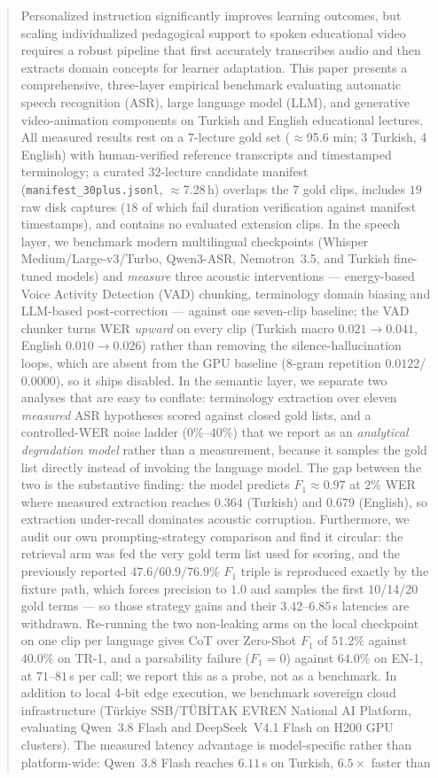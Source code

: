 \documentclass[conference]{IEEEtran}
\begin{document}
\begin{abstract}
Personalized instruction significantly improves learning outcomes, but scaling individualized pedagogical support to spoken educational video requires a robust pipeline that first accurately transcribes audio and then extracts domain concepts for learner adaptation. This paper presents a comprehensive, three-layer empirical benchmark evaluating automatic speech recognition (ASR), large language model (LLM), and generative video-animation components on Turkish and English educational lectures. All measured results rest on a $7$-lecture gold set ($\approx$95.6 min; 3 Turkish, 4 English) with human-verified reference transcripts and timestamped terminology; a curated $32$-lecture candidate manifest (\texttt{manifest\_30plus.jsonl}, $\approx$7.28\,h) overlaps the $7$ gold clips, includes $19$ raw disk captures ($18$ of which fail duration verification against manifest timestamps), and contains no evaluated extension clips. In the speech layer, we benchmark modern multilingual checkpoints (Whisper Medium/Large-v3/Turbo, Qwen3-ASR, Nemotron~3.5, and Turkish fine-tuned models) and \emph{measure} three acoustic interventions --- energy-based Voice Activity Detection (VAD) chunking, terminology domain biasing and LLM-based post-correction --- against one seven-clip baseline; the VAD chunker turns WER \emph{upward} on every clip (Turkish macro $0.021 \rightarrow 0.041$, English $0.010 \rightarrow 0.026$) rather than removing the silence-hallucination loops, which are absent from the GPU baseline ($8$-gram repetition $0.0122$/$0.0000$), so it ships disabled. In the semantic layer, we separate two analyses that are easy to conflate: terminology extraction over eleven \emph{measured} ASR hypotheses scored against closed gold lists, and a controlled-WER noise ladder ($0\%$--$40\%$) that we report as an \emph{analytical degradation model} rather than a measurement, because it samples the gold list directly instead of invoking the language model. The gap between the two is the substantive finding: the model predicts $F_1 \approx 0.97$ at $2\%$ WER where measured extraction reaches $0.364$ (Turkish) and $0.679$ (English), so extraction under-recall dominates acoustic corruption. Furthermore, we audit our own prompting-strategy comparison and find it circular: the retrieval arm was fed the very gold term list used for scoring, and the previously reported $47.6/60.9/76.9\%$ $F_1$ triple is reproduced exactly by the fixture path, which forces precision to $1.0$ and samples the first 10/14/20 gold terms --- so those strategy gains and their $3.42$--$6.85$\,s latencies are withdrawn. Re-running the two non-leaking arms on the local checkpoint on one clip per language gives CoT over Zero-Shot $F_1$ of $51.2\%$ against $40.0\%$ on TR-1, and a parsability failure ($F_1 = 0$) against $64.0\%$ on EN-1, at $71$--$81$\,s per call; we report this as a probe, not as a benchmark. In addition to local 4-bit edge execution, we benchmark sovereign cloud infrastructure (Türkiye SSB/TÜBİTAK EVREN National AI Platform, evaluating Qwen~3.8 Flash and DeepSeek~V4.1 Flash on H200 GPU clusters). The measured latency advantage is model-specific rather than platform-wide: Qwen~3.8 Flash reaches $6.11$\,s on Turkish, $6.5\times$ faster than 
\end{abstract}
\end{document}
